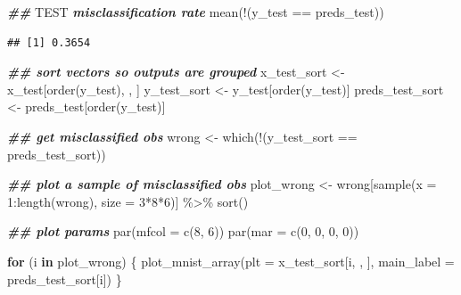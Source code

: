 \documentclass[
]{book}
\newenvironment{Shaded}{\begin{snugshade}}{\end{snugshade}}
\newcommand{\AlertTok}[1]{\textcolor[rgb]{0.94,0.16,0.16}{#1}}
\newcommand{\AttributeTok}[1]{\textcolor[rgb]{0.77,0.63,0.00}{#1}}
\newcommand{\ControlFlowTok}[1]{\textcolor[rgb]{0.13,0.29,0.53}{\textbf{#1}}}
\newcommand{\DecValTok}[1]{\textcolor[rgb]{0.00,0.00,0.81}{#1}}
\newcommand{\DocumentationTok}[1]{\textcolor[rgb]{0.56,0.35,0.01}{\textbf{\textit{#1}}}}
\newcommand{\FunctionTok}[1]{\textcolor[rgb]{0.00,0.00,0.00}{#1}}
\newcommand{\NormalTok}[1]{#1}
\newcommand{\OtherTok}[1]{\textcolor[rgb]{0.56,0.35,0.01}{#1}}
\newcommand{\SpecialCharTok}[1]{\textcolor[rgb]{0.00,0.00,0.00}{#1}}
\begin{document}
\begin{Shaded}
\begin{Highlighting}[]
\DocumentationTok{\#\# }\AlertTok{TEST}\DocumentationTok{ misclassification rate}
\FunctionTok{mean}\NormalTok{(}\SpecialCharTok{!}\NormalTok{(y\_test }\SpecialCharTok{==}\NormalTok{ preds\_test))}
\end{Highlighting}
\end{Shaded}

\begin{verbatim}
## [1] 0.3654
\end{verbatim}

\begin{Shaded}
\begin{Highlighting}[]
\DocumentationTok{\#\# sort vectors so outputs are grouped}
\NormalTok{x\_test\_sort }\OtherTok{\textless{}{-}}\NormalTok{ x\_test[}\FunctionTok{order}\NormalTok{(y\_test), , ]}
\NormalTok{y\_test\_sort }\OtherTok{\textless{}{-}}\NormalTok{ y\_test[}\FunctionTok{order}\NormalTok{(y\_test)]}
\NormalTok{preds\_test\_sort }\OtherTok{\textless{}{-}}\NormalTok{ preds\_test[}\FunctionTok{order}\NormalTok{(y\_test)]}

\DocumentationTok{\#\# get misclassified obs}
\NormalTok{wrong }\OtherTok{\textless{}{-}} \FunctionTok{which}\NormalTok{(}\SpecialCharTok{!}\NormalTok{(y\_test\_sort }\SpecialCharTok{==}\NormalTok{ preds\_test\_sort))}

\DocumentationTok{\#\# plot a sample of misclassified obs}
\NormalTok{plot\_wrong }\OtherTok{\textless{}{-}}\NormalTok{ wrong[}\FunctionTok{sample}\NormalTok{(}\AttributeTok{x =} \DecValTok{1}\SpecialCharTok{:}\FunctionTok{length}\NormalTok{(wrong), }\AttributeTok{size =} \DecValTok{3}\SpecialCharTok{*}\DecValTok{8}\SpecialCharTok{*}\DecValTok{6}\NormalTok{)] }\SpecialCharTok{\%\textgreater{}\%}
  \FunctionTok{sort}\NormalTok{()}

\DocumentationTok{\#\# plot params}
\FunctionTok{par}\NormalTok{(}\AttributeTok{mfcol =} \FunctionTok{c}\NormalTok{(}\DecValTok{8}\NormalTok{, }\DecValTok{6}\NormalTok{))}
\FunctionTok{par}\NormalTok{(}\AttributeTok{mar =} \FunctionTok{c}\NormalTok{(}\DecValTok{0}\NormalTok{, }\DecValTok{0}\NormalTok{, }\DecValTok{0}\NormalTok{, }\DecValTok{0}\NormalTok{))}

\ControlFlowTok{for}\NormalTok{ (i }\ControlFlowTok{in}\NormalTok{ plot\_wrong) \{}
  \FunctionTok{plot\_mnist\_array}\NormalTok{(}\AttributeTok{plt =}\NormalTok{ x\_test\_sort[i, , ],}
                   \AttributeTok{main\_label =}\NormalTok{ preds\_test\_sort[i])}
\NormalTok{\}}
\end{Highlighting}
\end{Shaded}
\end{document}
